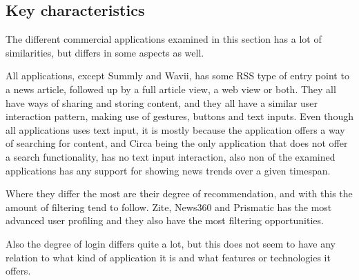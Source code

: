 \pagestyle{headings}

\subsection{Key characteristics}

The different commercial applications examined in this section has a lot of similarities, but differs in some aspects as well. 

All applications, except Summly and Wavii, has some RSS type of entry point to a news article, followed up by a full article view, a web view or both. They all have ways of sharing and storing content, and they all have a similar user interaction pattern, making use of gestures, buttons and text inputs. Even though all applications uses text input, it is mostly because the application offers a way of searching for content, and Circa being the only application that does not offer a search functionality, has no text input interaction, also non of the examined applications has any support for showing news trends over a given timespan.

Where they differ the most are their degree of recommendation, and with this the amount of filtering tend to follow. Zite, News360 and Prismatic has the most advanced user profiling and they also have the most filtering opportunities.

Also the degree of login differs quite a lot, but this does not seem to have any relation to what kind of application it is and what features or technologies it offers.